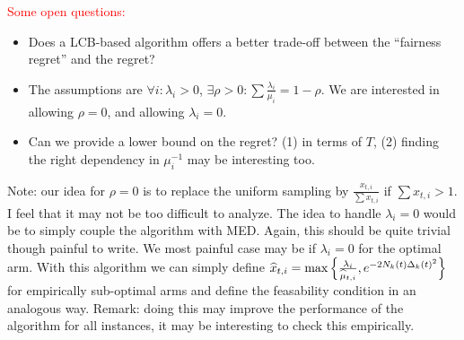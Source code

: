 \textcolor{red}{Some open questions:}

\begin{itemize}
	\item Does a LCB-based algorithm offers a better trade-off between the ``fairness regret'' and the regret? 
	\item The assumptions are $\forall i: \lambda_i>0$, $\exists \rho>0: \sum \frac{\lambda_i}{\mu_i}=1-\rho$. We are interested in allowing $\rho=0$, and allowing $\lambda_i=0$.
	\item Can we provide a lower bound on the regret? (1) in terms of $T$, (2) finding the right dependency in $\mu_i^{-1}$ may be interesting too. 
\end{itemize}

Note: our idea for $\rho=0$ is to replace the uniform sampling by $\frac{x_{t,i}}{\sum x_{t,i}}$ if $\sum x_{t,i}>1$. I feel that it may not be too difficult to analyze. The idea to handle $\lambda_i=0$ would be to simply couple the algorithm with MED. Again, this should be quite trivial though painful to write. We most painful case may be if $\lambda_i=0$ for the optimal arm. With this algorithm we can simply define $\widehat{x}_{t,i}=\max\left\{\frac{\lambda_i}{\widehat{\mu}_{t,i}}, e^{-2N_k(t)\Delta_k(t)^2} \right\}$ for empirically sub-optimal arms and define the feasability condition in an analogous way. Remark: doing this may improve the performance of the algorithm for all instances, it may be interesting to check this empirically.








